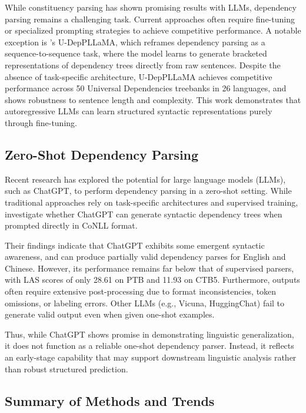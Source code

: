 While constituency parsing has shown promising results with LLMs, dependency parsing remains a challenging task. Current approaches often require fine-tuning or specialized prompting strategies to achieve competitive performance. A notable exception is \citet{hromei2024udeppllama}'s U-DepPLLaMA, which reframes dependency parsing as a sequence-to-sequence task, where the model learns to generate bracketed representations of dependency trees directly from raw sentences. Despite the absence of task-specific architecture, U-DepPLLaMA achieves competitive performance across 50 Universal Dependencies treebanks in 26 languages, and shows robustness to sentence length and complexity. This work demonstrates that autoregressive LLMs can learn structured syntactic representations purely through fine-tuning.

\subsection{Zero-Shot Dependency Parsing}

Recent research has explored the potential for large language models (LLMs), such as ChatGPT, to perform dependency parsing in a zero-shot setting. While traditional approaches rely on task-specific architectures and supervised training, \citet{lin2023chatgpt} investigate whether ChatGPT can generate syntactic dependency trees when prompted directly in CoNLL format.

Their findings indicate that ChatGPT exhibits some emergent syntactic awareness, and can produce partially valid dependency parses for English and Chinese. However, its performance remains far below that of supervised parsers, with LAS scores of only 28.61 on PTB and 11.93 on CTB5. Furthermore, outputs often require extensive post-processing due to format inconsistencies, token omissions, or labeling errors. Other LLMs (e.g., Vicuna, HuggingChat) fail to generate valid output even when given one-shot examples.

Thus, while ChatGPT shows promise in demonstrating linguistic generalization, it does not function as a reliable one-shot dependency parser. Instead, it reflects an early-stage capability that may support downstream linguistic analysis rather than robust structured prediction.

\subsection{Summary of Methods and Trends}

